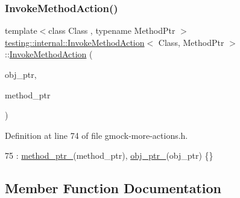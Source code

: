 \subsubsection{\texorpdfstring{Invoke\+Method\+Action()}{InvokeMethodAction()}}
{\footnotesize\ttfamily template$<$class Class , typename Method\+Ptr $>$ \\
\hyperlink{classtesting_1_1internal_1_1InvokeMethodAction}{testing\+::internal\+::\+Invoke\+Method\+Action}$<$ Class, Method\+Ptr $>$\+::\hyperlink{classtesting_1_1internal_1_1InvokeMethodAction}{Invoke\+Method\+Action} (\begin{DoxyParamCaption}\item[{Class $\ast$}]{obj\+\_\+ptr,  }\item[{Method\+Ptr}]{method\+\_\+ptr }\end{DoxyParamCaption})\hspace{0.3cm}{\ttfamily [inline]}}



Definition at line 74 of file gmock-\/more-\/actions.\+h.


\begin{DoxyCode}
75       : \hyperlink{classtesting_1_1internal_1_1InvokeMethodAction_ad87861bde8960e57a429b3cf5ba70133}{method\_ptr\_}(method\_ptr), \hyperlink{classtesting_1_1internal_1_1InvokeMethodAction_ac857e8bad8f6417640145ab1f5740963}{obj\_ptr\_}(obj\_ptr) \{\}
\end{DoxyCode}


\subsection{Member Function Documentation}
\mbox{\label{classtesting_1_1internal_1_1InvokeMethodAction_ade6d5b1ee276aedac65290465a447a87}} 
